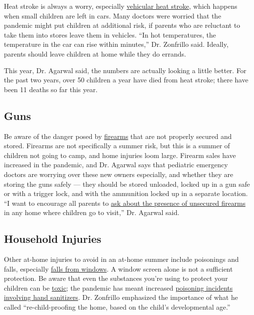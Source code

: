 Heat stroke is always a worry, especially
\href{https://www.kidsandcars.org/how-kids-get-hurt/heat-stroke/}{vehicular
heat stroke}, which happens when small children are left in cars. Many
doctors were worried that the pandemic might put children at additional
risk, if parents who are reluctant to take them into stores leave them
in vehicles. ``In hot temperatures, the temperature in the car can rise
within minutes,'' Dr. Zonfrillo said. Ideally, parents should leave
children at home while they do errands.

This year, Dr. Agarwal said, the numbers are actually looking a little
better. For the past two years, over 50 children a year have died from
heat stroke; there have been 11 deaths so far this year.

\hypertarget{guns}{%
\subsection{Guns}\label{guns}}

Be aware of the danger posed by
\href{https://well.blogs.nytimes.com/2013/01/07/keeping-guns-away-from-children/}{firearms}
that are not properly secured and stored. Firearms are not specifically
a summer risk, but this is a summer of children not going to camp, and
home injuries loom large. Firearm sales have increased in the pandemic,
and Dr. Agarwal says that pediatric emergency doctors are worrying over
these new owners especially, and whether they are storing the guns
safely --- they should be stored unloaded, locked up in a gun safe or
with a trigger lock, and with the ammunition locked up in a separate
location. ``I want to encourage all parents to
\href{https://well.blogs.nytimes.com/2016/06/24/ask-well-gun-storage-and-children/}{ask
about the presence of unsecured firearms} in any home where children go
to visit,'' Dr. Agarwal said.

\hypertarget{household-injuries}{%
\subsection{Household Injuries}\label{household-injuries}}

Other at-home injuries to avoid in an at-home summer include poisonings
and falls, especially
\href{https://www.nsc.org/home-safety/safety-topics/child-safety/window-safety\#:~:text=Falls\%20from\%20windows\%20are\%20more,to\%20go\%20to\%20the\%20hospital.}{falls
from windows}. A window screen alone is not a sufficient protection. Be
aware that even the substances you're using to protect your children can
be
\href{https://www.nytimes.com/2020/06/22/health/fda-Eskbiochem-toxic-hand-sanitizer-virus.html?searchResultPosition=1}{toxic};
the pandemic has meant increased
\href{https://www.healthychildren.org/English/health-issues/conditions/COVID-19/Pages/Keep-Hand-Sanitizer-Out-of-Childrens-Reach.aspx\#:~:text=Children\%20and\%20adults\%20also\%20have,after\%20repeated\%20use\%20on\%20skin.}{poisoning
incidents involving hand sanitizers}. Dr. Zonfrillo emphasized the
importance of what he called ``re-child-proofing the home, based on the
child's developmental age.''

